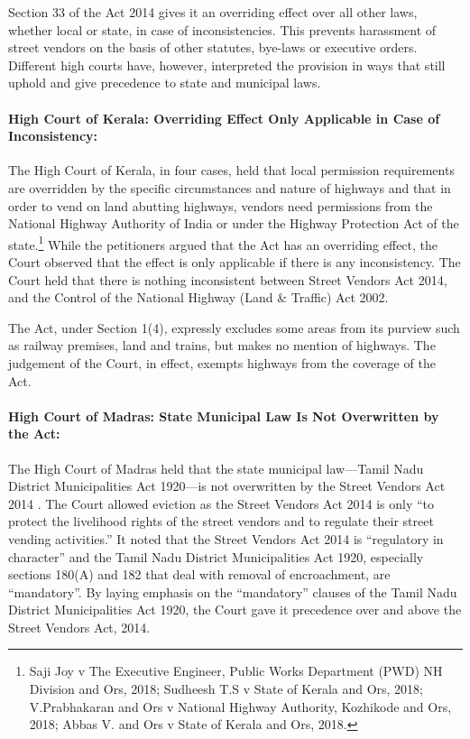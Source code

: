 \documentclass[a4paper, 12pt, twoside, table]{article}
\begin{document}
{Section 33 of the Act 2014 gives it an overriding effect over all other laws, whether local or state, in case of inconsistencies. This prevents harassment of street vendors on the basis of other statutes, bye-laws or executive orders. Different high courts have, however, interpreted the provision in ways that still uphold and give precedence to state and municipal laws.

\paragraph*{High Court of Kerala: Overriding Effect Only Applicable in Case of Inconsistency:}

The High Court of Kerala, in four cases, held that local permission requirements are overridden by the specific circumstances and nature of highways and that in order to vend on land abutting highways, vendors need permissions from the National Highway Authority of India or under the Highway Protection Act of the state.\footnote{ Saji Joy v The Executive Engineer, Public Works Department (PWD) NH Division and Ors, 2018; Sudheesh T.S v State of Kerala and Ors, 2018; V.Prabhakaran and Ors v National Highway Authority, Kozhikode and Ors, 2018; Abbas V. and Ors v State of Kerala and Ors, 2018.} While the petitioners argued that the Act has an overriding effect, the Court observed that the effect is only applicable if there is any inconsistency. The Court held that there is nothing inconsistent between Street Vendors Act 2014, and the Control of the National Highway (Land \& Traffic) Act 2002. 

The Act, under Section 1(4), expressly excludes some areas from its purview such as railway premises, land and trains, but makes no mention of highways. The judgement of the Court, in effect, exempts highways from the coverage of the Act. 

\paragraph*{High Court of Madras: State Municipal Law Is Not Overwritten by the Act:}

The High Court of Madras held that the state municipal law—Tamil Nadu District Municipalities Act 1920—is not overwritten by the Street Vendors Act 2014 \parencite{TRamalingam}. The Court allowed eviction as the Street Vendors Act 2014 is only “to protect the livelihood rights of the street vendors and to regulate their street vending activities.” It noted that the Street Vendors Act 2014 is “regulatory in character” and the Tamil Nadu District Municipalities Act 1920, especially sections 180(A) and 182 that deal with removal of encroachment, are “mandatory”. By laying emphasis on the “mandatory” clauses of the Tamil Nadu District Municipalities Act 1920, the Court gave it precedence over and above the Street Vendors Act, 2014.

}
\end{document}
